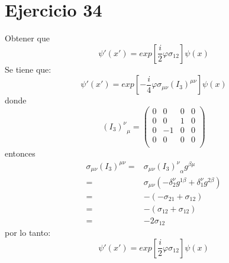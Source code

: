 \section*{Ejercicio 34}
Obtener que 
\begin{equation*}
    {\psi}'({x}')=exp\left[\frac{i}{2}\varphi \sigma_{12} \right]\psi(x)
\end{equation*}
Se tiene que:
\begin{equation*}
    {\psi}'({x}') = exp\left[-\frac{i}{4}\varphi \sigma_{\mu\nu}\left(I_3\right)^{\mu\nu} \right] \psi(x)
\end{equation*}
donde 
\begin{equation*}
    {\left(I_3\right)^\nu}_\mu = \left(\begin{matrix}
        0 & 0 & 0 & 0 \\
        0 & 0 & 1 &0 \\ 
        0 & -1 & 0 & 0 \\
        0 & 0 & 0 & 0 \\  
    \end{matrix}\right)
\end{equation*}
entonces
\begin{align*}
    \sigma_{\mu \nu} \left(I_3\right)^{\mu\nu} =& \sigma_{\mu \nu} {\left(I_3\right)^{\nu}}_{\alpha} g^{\beta\mu }\\
    =& \sigma_{\mu \nu } \left(-\delta_{2}^{\nu}g^{1\beta} +\delta_1^\nu g^{2\beta}\right)\\
    =& - \left(-\sigma_{21}+\sigma_{12}\right)\\
    =& - \left(\sigma_{12}+\sigma_{12}\right) \\
    =& -2 \sigma_{12}
\end{align*}
por lo tanto:
\begin{equation*}
    {\psi}'({x}')=exp\left[\frac{i}{2}\varphi \sigma_{12} \right]\psi(x)
\end{equation*}